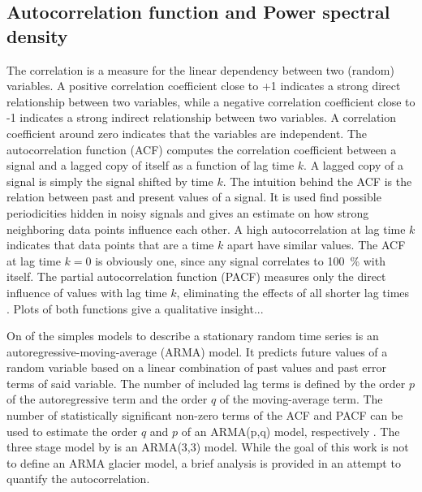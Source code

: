 
    \subsection{Autocorrelation function and Power spectral density} %
    \label{sub:autocorrelation_and_power_spectral_density_setup}

        The correlation is a measure for the linear dependency between two (random) variables. A positive correlation coefficient close to +1 indicates a strong direct relationship between two variables, while a negative correlation coefficient close to -1 indicates a strong indirect relationship between two variables. A correlation coefficient around zero indicates that the variables are independent. The autocorrelation function (ACF) computes the correlation coefficient between a signal and a lagged copy of itself as a function of lag time $k$. A lagged copy of a signal is simply the signal shifted by time $k$. The intuition behind the ACF is the relation between past and present values of a signal. It is used find possible periodicities hidden in noisy signals and gives an estimate on how strong neighboring data points influence each other. A high autocorrelation at lag time $k$ indicates that data points that are a time $k$ apart have similar values. The ACF at lag time $k=0$ is obviously one, since any signal correlates to \SI{100}{\percent} with itself. The partial autocorrelation function (PACF) measures only the direct influence of values with lag time $k$, eliminating the effects of all shorter lag times \citep{BoxJenkins2015}. Plots of both functions give a qualitative insight...

        On of the simples models to describe a stationary random time series is an autoregressive-moving-average (ARMA) model. It predicts future values of a random variable based on a linear combination of past values and past error terms of said variable. The number of included lag terms is defined by the order $p$ of the autoregressive term and the order $q$ of the moving-average term. The number of statistically significant non-zero terms of the ACF and PACF can be used to estimate the order $q$ and $p$ of an ARMA(p,q) model, respectively \citep{BoxJenkins2015}. The three stage model by \citet{Roe2014} is an ARMA(3,3) model. While the goal of this work is not to define an ARMA glacier model, a brief analysis is provided in an attempt to quantify the autocorrelation.
        
